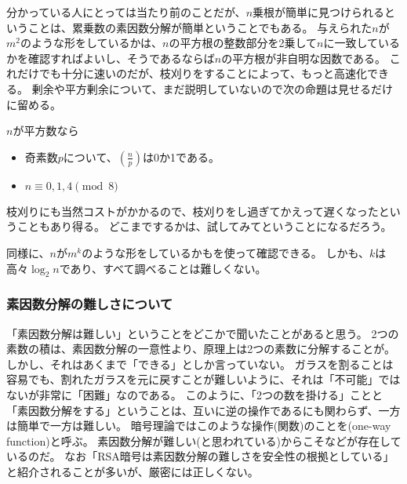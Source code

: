 
分かっている人にとっては当たり前のことだが、$n$乗根が簡単に見つけられるということは、累乗数の素因数分解が簡単ということでもある。
与えられた$n$が$m^2$のような形をしているかは、$n$の平方根の整数部分を2乗して$n$に一致しているかを確認すればよいし、そうであるならば$n$の平方根が非自明な因数である。
これだけでも十分に速いのだが、枝刈りをすることによって、もっと高速化できる。
剰余や平方剰余について、まだ説明していないので次の命題は見せるだけに留める。

\begin{Prop}{}{}
$n$が平方数なら
\begin{itemize}
 \item 奇素数$p$について、$\left(\frac{n}{p}\right)$は0か1である。
 \item $n \equiv 0,1,4 \pmod{8}$
\end{itemize}
\end{Prop}

枝刈りにも当然コストがかかるので、枝刈りをし過ぎてかえって遅くなったということもあり得る。
どこまでするかは、試してみてということになるだろう。


同様に、$n$が$m^k$のような形をしているかもを使って確認できる。
しかも、$k$は高々$\log_2{n}$であり、すべて調べることは難しくない。


\subsubsection{素因数分解の難しさについて}
「素因数分解は難しい」ということをどこかで聞いたことがあると思う。
2つの素数の積は、素因数分解の一意性より、原理上は2つの素数に分解することが。
しかし、それはあくまで「できる」としか言っていない。
ガラスを割ることは容易でも、割れたガラスを元に戻すことが難しいように、それは「不可能」ではないが非常に「困難」なのである。
このように、「2つの数を掛ける」ことと「素因数分解をする」ということは、互いに逆の操作であるにも関わらず、一方は簡単で一方は難しい。
暗号理論ではこのような操作(関数)のことを(one-way function)と呼ぶ。
素因数分解が難しい(と思われている)からこそなどが存在しているのだ。
なお「RSA暗号は素因数分解の難しさを安全性の根拠としている」と紹介されることが多いが、厳密には正しくない。

